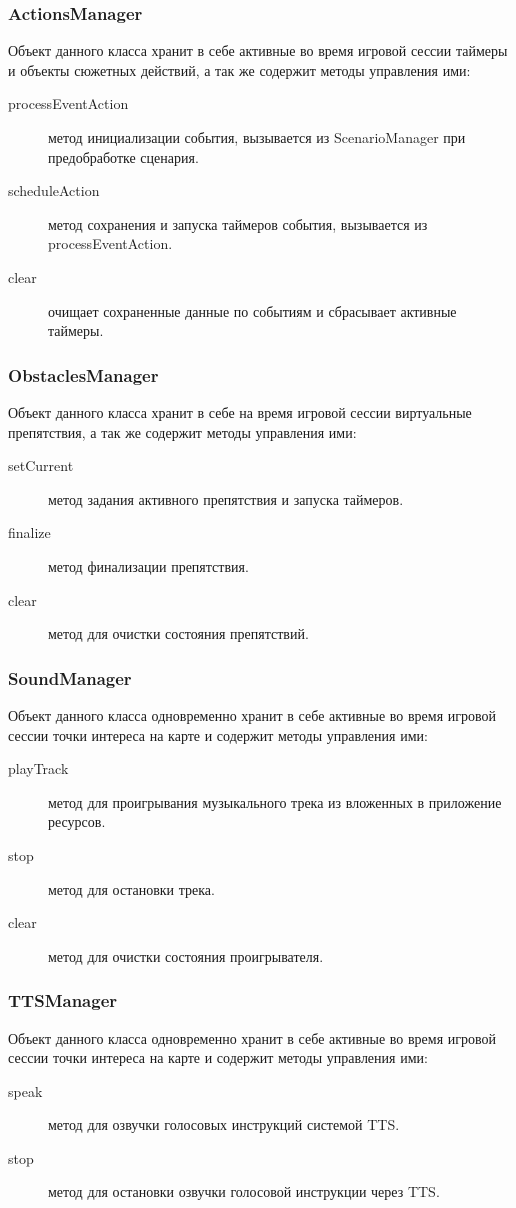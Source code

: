 \subsubsection*{ActionsManager}
Объект данного класса хранит в себе активные во время игровой сессии таймеры и объекты сюжетных действий, а так же содержит методы управления ими:
\begin{description}
	\item[processEventAction] метод инициализации события, вызывается из ScenarioManager при предобработке сценария. 
	\item[scheduleAction] метод сохранения и запуска таймеров события, вызывается из processEventAction.
	\item[clear] очищает сохраненные данные по событиям и сбрасывает активные таймеры.
\end{description}

\subsubsection*{ObstaclesManager}
Объект данного класса хранит в себе на время игровой сессии виртуальные препятствия, а так же содержит методы управления ими:
\begin{description}
	\item[setCurrent] метод задания активного препятствия и запуска таймеров.
	\item[finalize] метод финализации препятствия.
	\item[clear] метод для очистки состояния препятствий.
\end{description}

\subsubsection*{SoundManager}
Объект данного класса одновременно хранит в себе активные во время игровой сессии точки интереса на карте и содержит методы управления ими:
\begin{description}
	\item[playTrack] метод для проигрывания музыкального трека из вложенных в приложение ресурсов.
	\item[stop] метод для остановки трека.
	\item[clear] метод для очистки состояния проигрывателя.
\end{description}

\subsubsection*{TTSManager}
Объект данного класса одновременно хранит в себе активные во время игровой сессии точки интереса на карте и содержит методы управления ими:
\begin{description}
	\item[speak] метод для озвучки голосовых инструкций системой TTS.
	\item[stop] метод для остановки озвучки голосовой инструкции через TTS.
\end{description}

